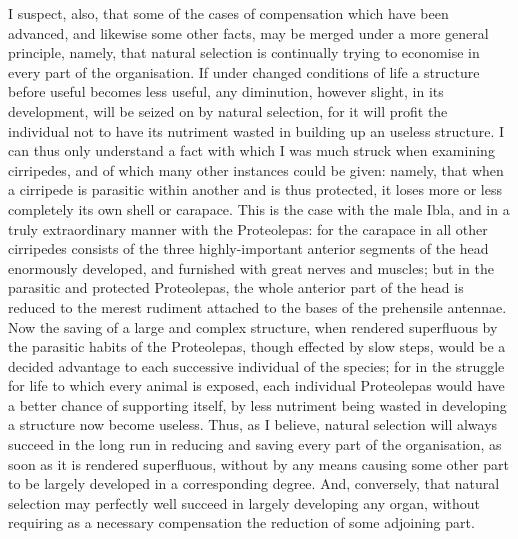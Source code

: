 I suspect, also, that some of the cases of compensation which have been advanced, and likewise some other facts, may be merged under a more general principle, namely, that natural selection is continually trying to economise in every part of the organisation. If under changed conditions of life a structure before useful becomes less useful, any diminution, however slight, in its development, will be seized on by natural selection, for it will profit the individual not to have its nutriment wasted in building up an useless structure. I can thus only understand a fact with which I was much struck when examining cirripedes, and of which many other instances could be given: namely, that when a cirripede is parasitic within another and is thus protected, it loses more or less completely its own shell or carapace. This is the case with the male Ibla, and in a truly extraordinary manner with the Proteolepas: for the carapace in all other cirripedes consists of the three highly-important anterior segments of the head enormously developed, and furnished with great nerves and muscles; but in the parasitic and protected Proteolepas, the whole anterior part of the head is reduced to the merest rudiment attached to the bases of the prehensile antennae. Now the saving of a large and complex structure, when rendered superfluous by the parasitic habits of the Proteolepas, though effected by slow steps, would be a decided advantage to each successive individual of the species; for in the struggle for life to which every animal is exposed, each individual Proteolepas would have a better chance of supporting itself, by less nutriment being wasted in developing a structure now become useless.
Thus, as I believe, natural selection will always succeed in the long run in reducing and saving every part of the organisation, as soon as it is rendered superfluous, without by any means causing some other part to be largely developed in a corresponding degree. And, conversely, that natural selection may perfectly well succeed in largely developing any organ, without requiring as a necessary compensation the reduction of some adjoining part.
